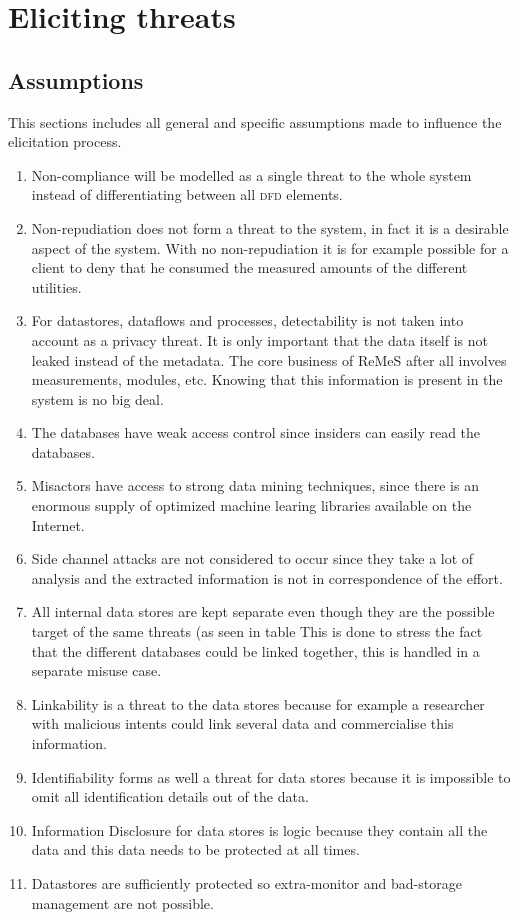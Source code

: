 \section{Eliciting threats}
\label{sec:eliciting-threats}

\subsection{Assumptions}
\label{sec:assumptions}

\npar This sections includes all general and specific assumptions made to
influence the elicitation process.

\begin{enumerate}

  \item Non-compliance will be modelled as a single threat to the whole system
  instead of differentiating between all \textsc{dfd} elements.
  \item Non-repudiation does not form a threat to the system, in fact it is a
  desirable aspect of the system. With no non-repudiation it is for
  example possible for a client to deny that he consumed the measured amounts
  of the different utilities.
  \item For datastores, dataflows and processes, detectability is not taken into
  account as a privacy threat. It is only important that the data itself is not
  leaked instead of the metadata. The core business of ReMeS after all involves
  measurements, modules, etc. Knowing that this information is present in the
  system is no big deal.
  \item The databases have weak access control since insiders can easily read
  the databases.
  \item Misactors have access to strong data mining techniques, since
  there is an enormous supply of optimized machine learing libraries available
  on the Internet.
  \item Side channel attacks are not considered to occur since they take a lot
  of analysis and the extracted information is not in correspondence of the
  effort.
   
  \item All internal data stores are kept separate even though they are the
  possible target of the same threats (as seen in table %
  This is done to stress the fact that the different databases could be linked
  together, this is handled in a separate misuse case.
  \item Linkability is a threat to the data stores because for example a
  researcher with malicious intents could link several data and commercialise
  this information.
  \item Identifiability forms as well a threat for data stores because it is
  impossible to omit all identification details out of the data. 
  \item Information Disclosure for data stores is logic because they contain all
  the data and this data needs to be protected at all times.
  \item Datastores are sufficiently protected so extra-monitor and bad-storage
  management are not possible.
  

\end{enumerate}
